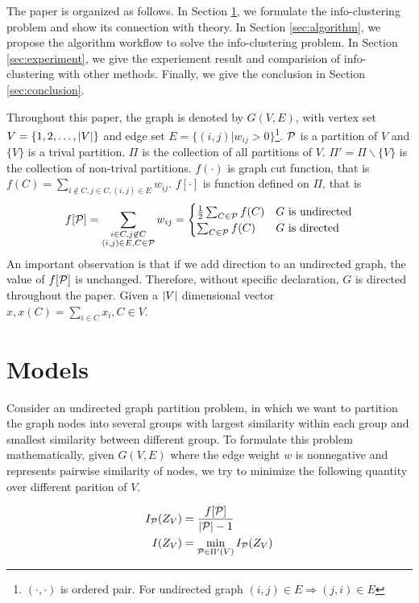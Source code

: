\documentclass{article}
\begin{document}
The paper is organized as follows. In Section \ref{sec:models}, we formulate the info-clustering problem and show its connection with theory. In Section \ref{sec:algorithm}, we propose the algorithm workflow to solve the info-clustering problem. In Section \ref{sec:experiment}, we give the experiement result and comparision of info-clustering with other methods. Finally, we give the conclusion in Section \ref{sec:conclusion}.

Throughout this paper, the graph is denoted by $G(V,E)$, with vertex set $V = \{1, 2, \dots, \abs{V}\}$ and edge set $E=\{(i,j) | w_{ij}>0\}$\footnote{$(\cdot, \cdot)$ is ordered pair. For undirected graph $(i,j) \in E \Rightarrow (j,i) \in E$}. $\P$ is a partition of $V$ and $\{V\}$ is a trival partition. $\Pi$ is the collection of all partitions of $V$. $\Pi' = \Pi \backslash \{V\}$ is the collection of non-trival partitions. $f(\cdot)$ is graph cut function, that is $f(C) = \sum_{i\not\in C, j\in C, (i,j) \in E} w_{ij}$. $f[\cdot]$ is function defined on $\Pi$, that is
\begin{equation}
f[\P] = \sum_{\substack{i\in C, j \not\in C\\ (i,j)\in E, C\in \mathcal{P}}} w_{ij} =
\begin{cases}
\frac{1}{2} \sum_{C\in \P}f(C)   & G \textrm{ is undirected} \\
\sum_{C\in \P}f(C)   & G \textrm{ is directed}
\end{cases}
\end{equation}
An important observation is that if we add direction to an undirected graph, the value of $f[\P]$ is unchanged. Therefore, without specific declaration, $G$ is directed throughout the paper. Given a $\abs{V}$ dimensional vector $x, x(C)=\sum_{i \in C} x_i, C\in V$.
\section{Models}\label{sec:models}

Consider an undirected graph partition problem, in which we want to partition the graph nodes into several groups with largest similarity within each group and smallest similarity between different group. To formulate this problem mathematically, given $G(V, E)$ where the edge weight $w$ is nonnegative and represents pairwise similarity of nodes, we try to minimize the following quantity over different parition of $V$.
\begin{definition}\label{def:ms}
\begin{align}
I_{\P}(Z_V) & = \frac{ f[\P] }{  \abs{\mathcal{P}} - 1 }\\
I(Z_V) & = \min_{\mathcal{P} \in \Pi'(V)} I_{\mathcal{P}}(Z_V)  \label{eq:ms}
\end{align}
\end{definition}
\end{document}
